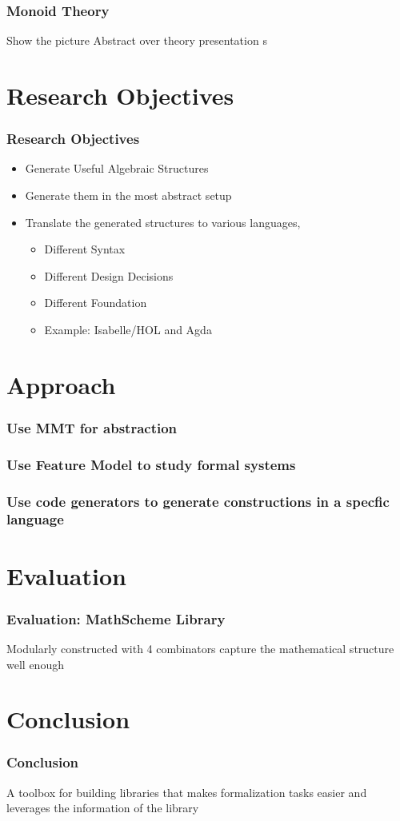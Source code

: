 \documentclass[t,12pt,numbers,fleqn,usenames,xcolor=dvipsnames]{beamer}
\begin{document}
\begin{frame}
\frametitle{Monoid Theory}
Show the picture 
Abstract over theory presentation s
\end{frame}

\section{Research Objectives}
\begin{frame}
\frametitle{Research Objectives}
\begin{itemize}
	\item Generate Useful Algebraic Structures 
	\item Generate them in the most abstract setup 
	\item Translate the generated structures to various languages, 
	  \begin{itemize}
	  	\item Different Syntax
	  	\item Different Design Decisions
	  	\item Different Foundation 
	  	\item Example: Isabelle/HOL and Agda 
	  \end{itemize}
\end{itemize}
\end{frame}

\section{Approach}
\begin{frame}
\frametitle{Use MMT for abstraction}
\end{frame}

\begin{frame}
\frametitle{Use Feature Model to study formal systems}
\end{frame}

\begin{frame}
\frametitle{Use code generators to generate constructions in a specfic language}
\end{frame}

\section{Evaluation}
\begin{frame}
\frametitle{Evaluation: MathScheme Library}
Modularly constructed with 4 combinators 
capture the mathematical structure well enough 
\end{frame}

\section{Conclusion}
\begin{frame}
\frametitle{Conclusion}
A toolbox for building libraries that makes formalization tasks easier and leverages the information of the library 
\end{frame}
\end{document}

